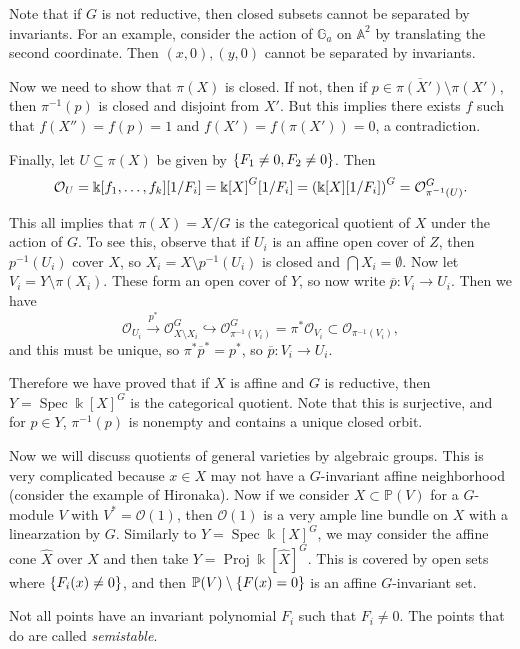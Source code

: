 \documentclass[leqno, openany]{memoir}
\theoremstyle{definition}
\theoremstyle{remark}
\theoremstyle{plain}
\theoremstyle{definition}
\theoremstyle{remark}
\newcommand{\A}{\mathbb{A}}
\renewcommand{\k}{\Bbbk}
\renewcommand{\P}{\mathbb{P}}
\newcommand{\mc}[1]{\mathcal{#1}}
\newcommand{\ol}[1]{\overline{#1}}
\newcommand{\wh}[1]{\widehat{#1}}
\DeclareMathOperator{\Spec}{Spec}
\DeclareMathOperator{\Proj}{Proj}
\begin{document}
Note that if $G$ is not reductive, then closed subsets cannot be separated by invariants. For an example, consider the action of $\mathbb{G}_a$ on $\A^2$ by translating the second coordinate. Then $(x,0), (y,0)$ cannot be separated by invariants.

Now we need to show that $\pi(X)$ is closed. If not, then if $p \in \ol{\pi(X')} \setminus \pi(X')$, then $\pi^{-1}(p)$ is closed and disjoint from $X'$. But this implies there exists $f$ such that $f(X'') = f(p) = 1$ and $f(X') = f(\pi(X')) = 0$, a contradiction.

Finally, let $U \subseteq \pi(X)$ be given by $\qty{F_1 \neq 0 , F_2 \neq 0}$. Then 
\[ \mc{O}_U = \k[f_1, \ldots, f_k][1/F_i] = {\k[X]}^G[1/F_i] = {\qty(\k[X][1/F_i])}^G = \mc{O}_{\pi^{-1}(U)}^G. \]

This all implies that $\pi(X) = X/G$ is the categorical quotient of $X$ under the action of $G$. To see this, observe that if $U_i$ is an affine open cover of $Z$, then $p^{-1}(U_i)$ cover $X$, so $X_i = X \setminus p^{-1}(U_i)$ is closed and $\bigcap X_i = \emptyset$. Now let $V_i = Y \setminus \pi(X_i)$. These form an open cover of $Y$, so now write $\ol{p} \colon V_i \to U_i$. Then we have 
\[ \mc{O}_{U_i} \xrightarrow{p^*} \mc{O}_{X\setminus X_i}^G \hookrightarrow \mc{O}_{\pi^{-1}(V_i)}^G = \pi^* \mc{O}_{V_i} \subset \mc{O}_{\pi^{-1}(V_i)}, \]
and this must be unique, so $\pi^* \ol{p}^* = p^*$, so $\ol{p} \colon V_i \to U_i$.

Therefore we have proved that if $X$ is affine and $G$ is reductive, then $Y = \Spec {\k[X]}^G$ is the categorical quotient. Note that this is surjective, and for $p \in Y$, $\pi^{-1}(p)$ is nonempty and contains a unique closed orbit.

Now we will discuss quotients of general varieties by algebraic groups. This is very complicated because $x \in X$ may not have a $G$-invariant affine neighborhood (consider the example of Hironaka). Now if we consider $X \subset \P(V)$ for a $G$-module $V$ with $V^* = \mc{O}(1)$, then $\mc{O}(1)$ is a very ample line bundle on $X$ with a linearzation by $G$. Similarly to $Y = \Spec {\k[X]}^G$, we may consider the affine cone $\wh{X}$ over $X$ and then take $Y = \Proj {\k[\wh{X}]}^G$. This is covered by open sets where $\qty{F_i(x) \neq 0}$, and then $\P(V) \setminus \qty{F(x) =0}$ is an affine $G$-invariant set.

Not all points have an invariant polynomial $F_i$ such that $F_i \neq 0$. The points that do are called \textit{semistable}.
\end{document}
